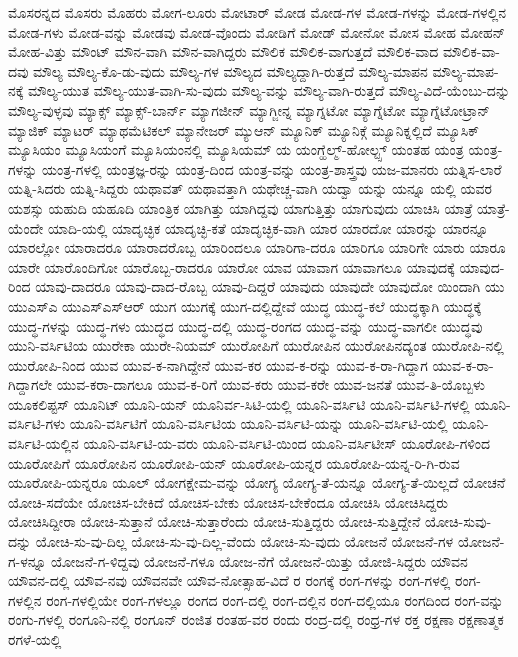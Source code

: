 {ಮೊಸರನ್ನದ
ಮೊಸರು
ಮೊಹರು
ಮೋಗ-ಲೂರು
ಮೋಟಾರ್
ಮೋಡ
ಮೋಡ-ಗಳ
ಮೋಡ-ಗಳನ್ನು
ಮೋಡ-ಗಳಲ್ಲಿನ
ಮೋಡ-ಗಳು
ಮೋಡ-ವನ್ನು
ಮೋಡವು
ಮೋಡ-ವೊಂದು
ಮೋಡಿಗೆ
ಮೋಡ್
ಮೋನೋ
ಮೋಸ
ಮೋಹ
ಮೋಹನ್
ಮೋಹ-ವಿತ್ತು
ಮೌಂಟ್
ಮೌನ-ವಾಗಿ
ಮೌನ-ವಾಗಿದ್ದರು
ಮೌಲಿಕ
ಮೌಲಿಕ-ವಾಗುತ್ತದೆ
ಮೌಲಿಕ-ವಾದ
ಮೌಲಿಕ-ವಾ-ದವು
ಮೌಲ್ಯ
ಮೌಲ್ಯ-ಕೊ-ಡು-ವುದು
ಮೌಲ್ಯ-ಗಳ
ಮೌಲ್ಯದ
ಮೌಲ್ಯದ್ದಾಗಿ-ರುತ್ತದೆ
ಮೌಲ್ಯ-ಮಾಪನ
ಮೌಲ್ಯ-ಮಾಪ-ನಕ್ಕೆ
ಮೌಲ್ಯ-ಯುತ
ಮೌಲ್ಯ-ಯುತ-ವಾಗಿ-ಸು-ವುದು
ಮೌಲ್ಯ-ವನ್ನು
ಮೌಲ್ಯ-ವಾಗಿ-ರುತ್ತದೆ
ಮೌಲ್ಯ-ವಿದೆ-ಯೆಂಬು-ದನ್ನು
ಮೌಲ್ಯ-ವುಳ್ಳವು
ಮ್ಯಾಕ್ಸ್
ಮ್ಯಾಕ್ಸ್-ಬಾರ್ನ್
ಮ್ಯಾಗಜೀನ್
ಮ್ಯಾಗ್ಜೀನ್ನ
ಮ್ಯಾಗ್ನಟೋ
ಮ್ಯಾಗ್ನೆಟೋ
ಮ್ಯಾಗ್ನೆಟೋಟ್ರಾನ್
ಮ್ಯಾಜಿಕ್
ಮ್ಯಾಟರ್
ಮ್ಯಾಥಮೆಟಿಕಲ್
ಮ್ಯಾನೇಜರ್
ಮ್ಯುಆನ್
ಮ್ಯೂನಿಕ್
ಮ್ಯೂನಿಕ್ಗೆ
ಮ್ಯೂನಿಕ್ನಲ್ಲಿದೆ
ಮ್ಯೂಸಿಕ್
ಮ್ಯೂಸಿಯಂ
ಮ್ಯೂಸಿಯಂಗೆ
ಮ್ಯೂಸಿಯಂನಲ್ಲಿ
ಮ್ಯೂಸಿಯಮ್
ಯ
ಯಂಗ್ಹೆಲ್ಮ್-ಹೋಲ್ಟ್ಸ್
ಯಂತಹ
ಯಂತ್ರ
ಯಂತ್ರ-ಗಳನ್ನು
ಯಂತ್ರ-ಗಳಲ್ಲಿ
ಯಂತ್ರಜ್ಞ-ರನ್ನು
ಯಂತ್ರ-ದಿಂದ
ಯಂತ್ರ-ವನ್ನು
ಯಂತ್ರ-ಶಾಸ್ತ್ರವು
ಯಜ-ಮಾನರು
ಯತ್ನಿಸ-ಲಾರೆ
ಯತ್ನಿ-ಸಿದರು
ಯತ್ನಿ-ಸಿದ್ದರು
ಯಥಾವತ್
ಯಥಾವತ್ತಾಗಿ
ಯಥೇಚ್ಚ-ವಾಗಿ
ಯದ್ವಾ
ಯನ್ನು
ಯನ್ನೂ
ಯಲ್ಲಿ
ಯವರ
ಯಶಸ್ಸು
ಯಹುದಿ
ಯಹೂದಿ
ಯಾಂತ್ರಿಕ
ಯಾಗಿತ್ತು
ಯಾಗಿದ್ದವು
ಯಾಗುತ್ತಿತ್ತು
ಯಾಗುವುದು
ಯಾಚಿಸಿ
ಯಾತ್ರೆ
ಯಾತ್ರೆ-ಯೆಂದೇ
ಯಾದಿ-ಯಲ್ಲಿ
ಯಾದೃಚ್ಛಿಕ
ಯಾದೃಚ್ಛಿ-ಕತೆ
ಯಾದೃಚ್ಛಿಕ-ವಾಗಿ
ಯಾರ
ಯಾರದೋ
ಯಾರನ್ನು
ಯಾರನ್ನೂ
ಯಾರಲ್ಲೋ
ಯಾರಾದರೂ
ಯಾರಾದರೊಬ್ಬ
ಯಾರಿಂದಲೂ
ಯಾರಿಗಾ-ದರೂ
ಯಾರಿಗೂ
ಯಾರಿಗೇ
ಯಾರು
ಯಾರೂ
ಯಾರೇ
ಯಾರೊಂದಿಗೋ
ಯಾರೊಬ್ಬ-ರಾದರೂ
ಯಾರೋ
ಯಾವ
ಯಾವಾಗ
ಯಾವಾಗಲೂ
ಯಾವುದಕ್ಕೆ
ಯಾವುದ-ರಿಂದ
ಯಾವು-ದಾದರೂ
ಯಾವು-ದಾದ-ರೊಬ್ಬ
ಯಾವು-ದಿದ್ದರೆ
ಯಾವುದು
ಯಾವುದೇ
ಯಾವುದೋ
ಯಿಂದಾಗಿ
ಯು
ಯುಎಸ್ಎ
ಯುಎಸ್ಎಸ್ಆರ್
ಯುಗ
ಯುಗಕ್ಕೆ
ಯುಗ-ದಲ್ಲಿದ್ದೇವೆ
ಯುದ್ಧ
ಯುದ್ಧ-ಕಲೆ
ಯುದ್ಧಕ್ಕಾಗಿ
ಯುದ್ಧಕ್ಕೆ
ಯುದ್ಧ-ಗಳನ್ನು
ಯುದ್ಧ-ಗಳು
ಯುದ್ಧದ
ಯುದ್ಧ-ದಲ್ಲಿ
ಯುದ್ಧ-ರಂಗದ
ಯುದ್ಧ-ವನ್ನು
ಯುದ್ಧ-ವಾಗಲೀ
ಯುದ್ಧವು
ಯುನಿ-ವರ್ಸಿಟಿಯ
ಯುರೇಕಾ
ಯುರೇ-ನಿಯಮ್
ಯುರೋಪಿಗೆ
ಯುರೋಪಿನ
ಯುರೋಪಿನದ್ಯಂತ
ಯುರೋಪಿ-ನಲ್ಲಿ
ಯುರೋಪಿ-ನಿಂದ
ಯುವ
ಯುವ-ಕ-ನಾಗಿದ್ದೇನೆ
ಯುವ-ಕರ
ಯುವ-ಕ-ರನ್ನು
ಯುವ-ಕ-ರಾ-ಗಿದ್ದಾಗ
ಯುವ-ಕ-ರಾ-ಗಿದ್ದಾಗಲೇ
ಯುವ-ಕರಾ-ದಾಗಲೂ
ಯುವ-ಕ-ರಿಗೆ
ಯುವ-ಕರು
ಯುವ-ಕರೇ
ಯುವ-ಜನತೆ
ಯುವ-ತಿ-ಯೊಬ್ಬಳು
ಯೂಕಲಿಪ್ಟಸ್
ಯೂನಿಟ್
ಯೂನಿ-ಯನ್
ಯೂನಿರ್ವ-ಸಿಟಿ-ಯಲ್ಲಿ
ಯೂನಿ-ವರ್ಸಿಟಿ
ಯೂನಿ-ವರ್ಸಿಟಿ-ಗಳಲ್ಲಿ
ಯೂನಿ-ವರ್ಸಿಟಿ-ಗಳು
ಯೂನಿ-ವರ್ಸಿಟಿಗೆ
ಯೂನಿ-ವರ್ಸಿಟಿಯ
ಯೂನಿ-ವರ್ಸಿಟಿ-ಯನ್ನು
ಯೂನಿ-ವರ್ಸಿಟಿ-ಯಲ್ಲಿ
ಯೂನಿ-ವರ್ಸಿಟಿ-ಯಲ್ಲಿನ
ಯೂನಿ-ವರ್ಸಿಟಿ-ಯ-ವರು
ಯೂನಿ-ವರ್ಸಿಟಿ-ಯಿಂದ
ಯೂನಿ-ವರ್ಸಿಟೀಸ್
ಯೂರೋಪಿ-ಗಳಿಂದ
ಯೂರೋಪಿಗೆ
ಯೂರೋಪಿನ
ಯೂರೋಪಿ-ಯನ್
ಯೂರೋಪಿ-ಯನ್ನರ
ಯೂರೋಪಿ-ಯನ್ನ-ರಿ-ಗಿ-ರುವ
ಯೂರೋಪಿ-ಯನ್ನರೂ
ಯೂಲ್
ಯೋಗಕ್ಷೇಮ-ವನ್ನು
ಯೋಗ್ಯ
ಯೋಗ್ಯ-ತೆ-ಯನ್ನೂ
ಯೋಗ್ಯ-ತೆ-ಯಿಲ್ಲದೆ
ಯೋಚನೆ
ಯೋಚಿ-ಸದೆಯೇ
ಯೋಚಿಸ-ಬೇಕಿದೆ
ಯೋಚಿಸ-ಬೇಕು
ಯೋಚಿಸ-ಬೇಕೆಂದೂ
ಯೋಚಿಸಿ
ಯೋಚಿಸಿದ್ದರು
ಯೋಚಿಸಿದ್ದೀರಾ
ಯೋಚಿ-ಸುತ್ತಾನೆ
ಯೋಚಿ-ಸುತ್ತಾರೆಂದು
ಯೋಚಿ-ಸುತ್ತಿದ್ದರು
ಯೋಚಿ-ಸುತ್ತಿದ್ದೇನೆ
ಯೋಚಿ-ಸುವು-ದನ್ನು
ಯೋಚಿ-ಸು-ವು-ದಿಲ್ಲ
ಯೋಚಿ-ಸು-ವು-ದಿಲ್ಲ-ವೆಂದು
ಯೋಚಿ-ಸು-ವುದು
ಯೋಜನೆ
ಯೋಜನೆ-ಗಳ
ಯೋಜನೆ-ಗ-ಳನ್ನೂ
ಯೋಜನೆ-ಗ-ಳಿದ್ದವು
ಯೋಜನೆ-ಗಳೂ
ಯೋಜ-ನೆಗೆ
ಯೋಜನೆ-ಯಿತ್ತು
ಯೋಜಿ-ಸಿದ್ದರು
ಯೌವನ
ಯೌವನ-ದಲ್ಲಿ
ಯೌವ-ನವು
ಯೌವನವೇ
ಯೌವ-ನೋತ್ಸಾಹ-ವಿದೆ
ರ
ರಂಗಕ್ಕೆ
ರಂಗ-ಗಳನ್ನು
ರಂಗ-ಗಳಲ್ಲಿ
ರಂಗ-ಗಳಲ್ಲಿನ
ರಂಗ-ಗಳಲ್ಲಿಯೇ
ರಂಗ-ಗಳಲ್ಲೂ
ರಂಗದ
ರಂಗ-ದಲ್ಲಿ
ರಂಗ-ದಲ್ಲಿನ
ರಂಗ-ದಲ್ಲಿಯೂ
ರಂಗದಿಂದ
ರಂಗ-ವನ್ನು
ರಂಗು-ಗಳಲ್ಲಿ
ರಂಗೂನಿ-ನಲ್ಲಿ
ರಂಗೂನ್
ರಂಜಿತ
ರಂತಹ-ವರ
ರಂದು
ರಂದ್ರ-ದಲ್ಲಿ
ರಂಧ್ರ-ಗಳ
ರಕ್ತ
ರಕ್ಷಣಾ
ರಕ್ಷಣಾತ್ಮಕ
ರಗಳೆ-ಯಲ್ಲಿ
}
